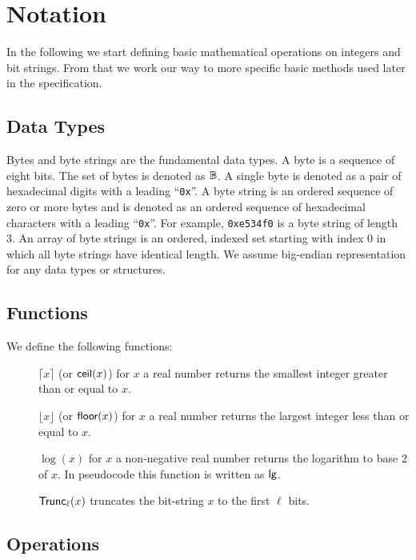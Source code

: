  
\section{Notation}
\label{sec:notation}


In the following we start defining basic mathematical operations on integers and bit strings. From that we work our way to more specific basic methods used later in the specification.

\subsection{Data Types}

Bytes and byte strings are the fundamental data types. A byte is a sequence of eight bits. The set of bytes is denoted as $\mathbb{B}$. A single byte is denoted as a pair of hexadecimal digits with a leading ``\texttt{0x}''. A byte string is an ordered sequence of zero or more bytes and is denoted as an ordered sequence of hexadecimal characters with a leading ``\texttt{0x}''. For example, \texttt{0xe534f0} is a byte string of length 3. An array of byte strings is an ordered, indexed set starting with index 0 in which all byte strings have identical length. We assume big-endian representation for any data types or structures.

\subsection{Functions}

We define the following functions:
\begin{description}
    \item[]$\lceil x \rceil$ (or $\textsf{ceil}(x)$) for $x$ a real number returns the smallest integer greater than or equal to $x$.
    \item[]$\lfloor x \rfloor$ (or $\textsf{floor}(x)$) for $x$ a real number returns the largest integer less than or equal to $x$.
    \item[]$\log(x)$ for $x$ a non-negative real number returns the logarithm to base 2 of $x$. In pseudocode this function is written as $\textsf{lg}$.
    \item[]$\textsf{Trunc}_\ell(x)$ truncates the bit-string $x$ to the first $\ell$ bits.
\end{description}

\subsection{Operations}

